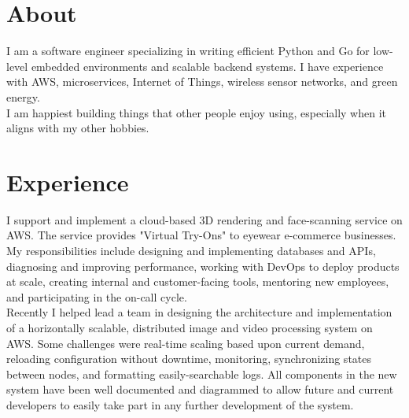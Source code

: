 \documentclass[letterpaper]{deedy-resume} %
\begin{document}
\begin{minipage}[t]{0.33\textwidth}
\sectionspace %


\end{minipage} %
\hfill
%
%
\begin{minipage}[t]{0.66\textwidth} %


\section{About}
I am a software engineer specializing in writing efficient Python and Go for low-level embedded environments and scalable backend systems.
I have experience with AWS, microservices, Internet of Things, wireless sensor networks, and green energy.\\[1em]
I am happiest building things that other people enjoy using, especially when it aligns with my other hobbies.
\sectionspace


\section{Experience}


I support and implement a cloud-based 3D rendering and face-scanning service on AWS. The service provides "Virtual Try-Ons" to eyewear e-commerce businesses.\\[1em]
My responsibilities include designing and implementing databases and APIs, diagnosing and improving performance, working with DevOps to deploy products at scale, creating internal and customer-facing tools, mentoring new employees, and participating in the on-call cycle.\\[1em]
Recently I helped lead a team in designing the architecture and implementation of a horizontally scalable, distributed image and video processing system on AWS. Some challenges were real-time scaling based upon current demand, reloading configuration without downtime, monitoring, synchronizing states between nodes, and formatting easily-searchable logs. All components in the new system have been well documented and diagrammed to allow future and current developers to easily take part in any further development of the system.
\sectionspace


\end{minipage}
\end{document}
